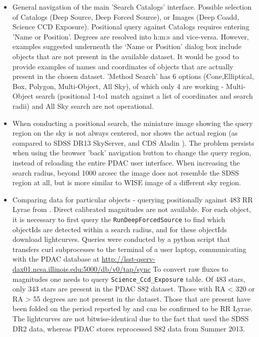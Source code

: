 \documentclass[fleqn,usenatbib, onecolumn]{mnras} %
\begin{document}
\begin{itemize}
	\item General navigation of the main 'Search Catalogs' interface. Possible selection  of Catalogs (Deep Source, Deep Forced Source), or Images (Deep Coadd, Science CCD Exposure).  Positional query against Catalogs requires entering 'Name or Position'.  Degrees are resolved into h:m:s and vice-versa.  However, examples suggested underneath the   ‘Name or Position’ dialog box  include objects that are not present in the available dataset.  It would be good to provide examples of names and coordinates of objects that are actually present in the chosen dataset. 'Method Search' has 6 options (Cone,Elliptical, Box, Polygon, Multi-Object, All Sky), of which only 4 are working - Multi-Object search (positional 1-to1 match  against a list of coordinates and search radii) and All Sky search are not operational. 
	\item When conducting a positional search, the miniature image showing the query region on the sky is not always centered, nor shows the actual region (as compared to SDSS DR13 SkyServer, and CDS Aladin	). The problem persists when using the browser 'back' navigation button to change the query region, instead of reloading the entire PDAC user interface. When increasing the search radius, beyond 1000 arcsec the image does not resemble the SDSS region at all, but is more similar to WISE image of  a different sky region. 
    \item Comparing data for particular objects - querying positionally against 483 RR Lyrae  from \cite{sesar2010}. Direct calibrated magnitudes are not available. For each object, it is necessary to first query the \verb|RunDeepForcedSource|  to find which objectIds are detected within a search radius, and for these objectIds download lightcurves.  Queries were conducted by  a python script that transfers curl subprocesses to the terminal of a user laptop, communicating with the PDAC database at \url{http://lsst-qserv-dax01.ncsa.illinois.edu:5000/db/v0/tap/sync}
    To convert raw fluxes to magnitudes one needs to query   \verb|Science_Ccd_Exposure|  table. Of 483 stars,  only 343 stars are present in the PDAC S82 dataset. Those with RA < 320  or RA > 55 degrees are not present in the dataset.  Those that are present have been folded on the period reported by \cite{sesar2010} and can be confirmed to be RR Lyrae.  The lightcurves are not bitwise-identical due to the fact that \cite{sesar2010} used the SDSS DR2 data, whereas PDAC stores reprocessed S82 data from Summer 2013. 
 \end{itemize}   








\bsp	%
\label{lastpage}
\end{document}

